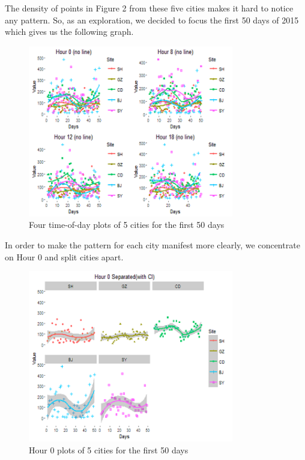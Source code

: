 \documentclass[11pt]{article} %
\begin{document}
	The density of points in Figure 2 from these five cities makes it hard to notice any pattern. So, as an exploration, we decided to focus the first 50 days of 2015 which gives us the following graph.
	
\begin{figure}[!ht]
  \centering
    \includegraphics[width=0.8\textwidth]{Figure1-2}
      \caption{Four time-of-day plots of 5 cities for the first 50 days}
\end{figure}

In order to make the pattern for each city manifest more clearly, we concentrate on Hour 0 and split cities apart. 

\begin{figure}[!ht]
  \centering
    \includegraphics[width=0.8\textwidth]{Figure1-3}
      \caption{Hour 0 plots of 5 cities for the first 50 days}
\end{figure}
\end{document}
